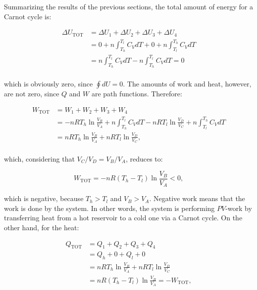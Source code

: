 \documentclass[
  9pt,
]{extbook}
\theoremstyle{definition}
\theoremstyle{definition}
\theoremstyle{definition}
\theoremstyle{remark}
\begin{document}
Summarizing the results of the previous sections, the total amount of energy for a Carnot cycle is:

\begin{equation}
\begin{aligned}
  \Delta U_{\text{TOT}} & = \Delta U_1+\Delta U_2+\Delta U_3+\Delta U_4 \\
                 & = 0 + n \int_{T_h}^{T_l} C_V dT + 0 + n \int_{T_l}^{T_h} C_V dT  \\
                 & = n \int_{T_h}^{T_l} C_V dT - n \int_{T_h}^{T_l} C_V dT = 0 \\
\end{aligned}
  \label{eq:UtotCC}
\end{equation}

which is obviously zero, since \(\oint dU=0\). The amounts of work and heat, however, are not zero, since \(Q\) and \(W\) are path functions. Therefore:

\begin{equation}
\begin{aligned}
  W_{\text{TOT}} & = W_1+W_2+W_3+W_4 \\
                 & = - nRT_h \ln \frac{V_B}{V_A} + n \int_{T_h}^{T_l} C_V dT - nRT_l \ln \frac{V_D}{V_C} + n \int_{T_l}^{T_h} C_V dT \\
                 & = nRT_h \ln \frac{V_B}{V_A} + nRT_l \ln \frac{V_D}{V_C}, \\
\end{aligned}
  \label{eq:WtotCC}
\end{equation}

which, considering that \(V_C/V_D=V_B/V_A\), reduces to:

\begin{equation}
  W_{\text{TOT}} = - nR \left( T_h-T_l \right) \ln \frac{V_B}{V_A} < 0,
  \label{eq:WtotCC2}
\end{equation}

which is negative, because \(T_h>T_l\) and \(V_B>V_A\). Negative work means that the work is done by the system. In other words, the system is performing \(PV\)-work by transferring heat from a hot reservoir to a cold one via a Carnot cycle. On the other hand, for the heat:

\begin{equation}
\begin{aligned}
  Q_{\text{TOT}} & = Q_1+Q_2+Q_3+Q_4 \\
                 & = Q_h + 0 + Q_l + 0    \\
                 & = nRT_h \ln \frac{V_B}{V_A} + nRT_l \ln \frac{V_D}{V_C} \\
                 & = nR \left( T_h-T_l \right) \ln \frac{V_B}{V_A} = -W_{\text{TOT}},
\end{aligned}
  \label{eq:QtotCC}
\end{equation}
\end{document}
